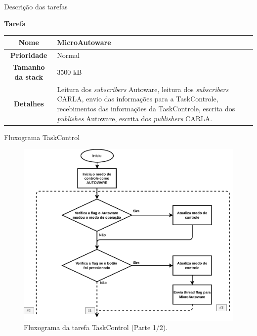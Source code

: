 \documentclass{if-beamer}
\begin{document}
\begin{frame}{Descrição das tarefas}

\begin{block}{\textbf{Tarefa}}
	
	\centering
	
	\begin{tabular}{c|p{8cm}}
		\textbf{Nome} & MicroAutoware \\
		\hline
		\textbf{Prioridade}& Normal \\
		\hline
		\textbf{Tamanho da stack} & 3500 kB \\
		\hline
		\textbf{Detalhes} & Leitura dos \textit{subscribers} Autoware, leitura dos \textit{subscribers} CARLA, envio das informações para a TaskControle, recebimentos das informações da TaskControle, escrita dos \textit{publishes} Autoware, escrita dos \textit{publishers} CARLA. \\
	\end{tabular}
	
\end{block}	

\end{frame}




\begin{frame}{Fluxograma TaskControl}
	
	\begin{figure}[H]
		\centering
		\includegraphics[width=0.6\linewidth]{img/fluxograma_taskcontrol_1}
		\caption{Fluxograma da tarefa TaskControl (Parte 1/2).}
		\label{fig:fluxograma_taskcontrol_1}
	\end{figure}
	
\end{frame}
\end{document}
